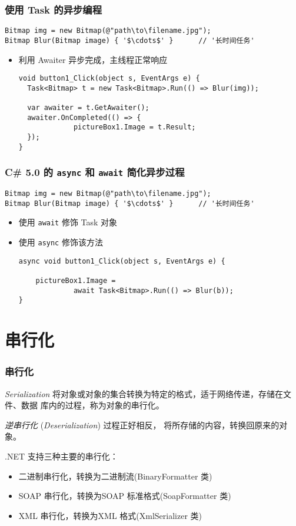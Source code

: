 \begin{frame}[fragile,t]
\frametitle{使用 Task 的异步编程}
\begin{lstlisting}[escapeinside='']
Bitmap img = new Bitmap(@"path\to\filename.jpg");
Bitmap Blur(Bitmap image) { '$\cdots$' }      // '长时间任务'
\end{lstlisting}
\begin{itemize}
\item 利用 Awaiter 异步完成，主线程正常响应
\begin{lstlisting}[escapeinside='']
void button1_Click(object s, EventArgs e) {
  Task<Bitmap> t = new Task<Bitmap>.Run(() => Blur(img));

  var awaiter = t.GetAwaiter();
  awaiter.OnCompleted(() => { 
             pictureBox1.Image = t.Result; 
  });
}
\end{lstlisting}
\end{itemize}
\end{frame}



\begin{frame}[fragile,t]
\frametitle{C\# 5.0 的 \texttt{async} 和 \texttt{await} 简化异步过程}
\begin{lstlisting}[escapeinside='']
Bitmap img = new Bitmap(@"path\to\filename.jpg");
Bitmap Blur(Bitmap image) { '$\cdots$' }      // '长时间任务'
\end{lstlisting}
\begin{itemize}
\item 使用 \texttt{await} 修饰 Task 对象
\item 使用 \texttt{async} 修饰该方法
\begin{lstlisting}
async void button1_Click(object s, EventArgs e) {

    pictureBox1.Image = 
             await Task<Bitmap>.Run(() => Blur(b));
}
\end{lstlisting}
\end{itemize}
\end{frame}


\section{串行化}

\begin{frame}
\frametitle{串行化}
\begin{block}{\textit{Serialization}}
\CJKindent 将对象或对象的集合转换为特定的格式，适于网络传递，存储在文件、数据
库内的过程，称为对象的串行化。

{\em 逆串行化} (\textit{Deserialization}) 过程正好相反，
将所存储的内容，转换回原来的对象。
\end{block}
.NET 支持三种主要的串行化：
\begin{itemize}
\item 二进制串行化，转换为二进制流(BinaryFormatter 类)
\item SOAP 串行化，转换为SOAP 标准格式(SoapFormatter 类)
\item XML 串行化，转换为XML 格式(XmlSerializer 类)
\end{itemize}
\end{frame}

